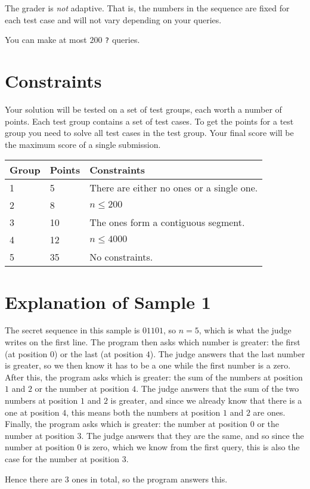 The grader is \emph{not} adaptive.
That is, the numbers in the sequence are fixed for each test case and will not vary depending on your queries.

You can make at most $200$ \texttt{?} queries.

\section*{Constraints}
Your solution will be tested on a set of test groups, each worth a number of points.
Each test group contains a set of test cases.
To get the points for a test group you need to solve all test cases in the test group.
Your final score will be the maximum score of a single submission.

\noindent
\begin{tabular}{| l | l | l |}
\hline
Group & Points & Constraints \\ \hline
1     & 5     & There are either no ones or a single one. \\ \hline
2     & 8    & $n \leq 200$ \\ \hline
3     & 10    & The ones form a contiguous segment. \\ \hline
4     & 12    & $n \leq 4000$ \\ \hline
5     & 35    & No constraints. \\ \hline
\end{tabular}

\section*{Explanation of Sample 1}
The secret sequence in this sample is $01101$, so $n = 5$, which is what the judge writes on the first line.
The program then asks which number is greater: the first (at position $0$) or the last (at position $4$).
The judge answers that the last number is greater, so we then know it has to be a one while the first number is a zero.
After this, the program asks which is greater: the sum of the numbers at position $1$ and $2$ or the number at position $4$.
The judge answers that the sum of the two numbers at position $1$ and $2$ is greater, and since we already
know that there is a one at position $4$, this means both the numbers at position $1$ and $2$ are ones.
Finally, the program asks which is greater: the number at position $0$ or the number at position $3$.
The judge answers that they are the same, and so since the number at position $0$ is zero, which we know
from the first query, this is also the case for the number at position $3$.

Hence there are $3$ ones in total, so the program answers this.
